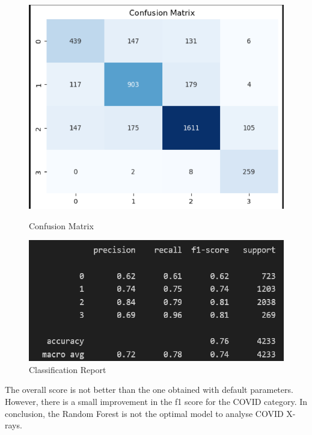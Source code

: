 \documentclass{article}
\begin{document}
\begin{figure}[H]
    \centering
    \begin{minipage}[t]{0.48\textwidth}
        \centering
        \includegraphics[width=\linewidth]{CM_RF_opt.png}
        \caption{Confusion Matrix}
        \label{fig:confusion_rf_opt}
    \end{minipage}
    \hfill
    \begin{minipage}[t]{0.48\textwidth}
        \centering
        \includegraphics[width=\linewidth]{CR_RF_opt.png}
        \caption{Classification Report}
        \label{fig:classification_rf_opt}
    \end{minipage}
\end{figure}

The overall score is not better than the one obtained with default parameters. However, there is a small improvement in the f1 score for the COVID category.
In conclusion, the Random Forest is not the optimal model to analyse COVID X-rays. 
\end{document}
